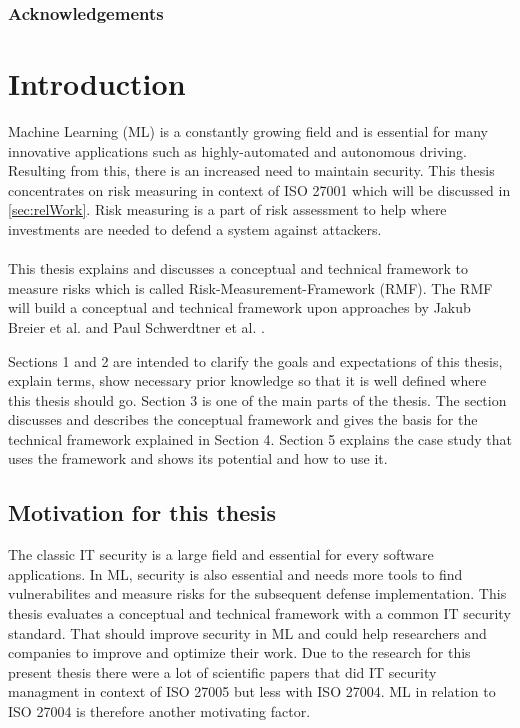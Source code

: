 \begin{abstract}

\end{abstract}

\subsubsection*{Acknowledgements}

\newpage

\section{Introduction}
\label{sec:intro}

Machine Learning (ML) is a constantly growing field and is essential for many innovative applications such as highly-automated and autonomous driving. Resulting from this,
there is an increased need to maintain security. This thesis concentrates on risk measuring in context of ISO 27001 which will be discussed in \ref{sec:relWork}. Risk
measuring is a part of risk assessment to help where investments are needed to defend a system against attackers. \\ \\
This thesis explains and discusses a conceptual and technical framework to measure risks which is called Risk-Measurement-Framework (RMF). The RMF will build a conceptual and technical
framework upon approaches by Jakub Breier et al. \cite{DBLP:journals/corr/abs-2012-04884} and Paul Schwerdtner et al. \cite{DBLP:journals/corr/abs-2011-04328}.

Sections 1 and 2 are intended to clarify the goals and expectations of this thesis, explain terms, show necessary prior knowledge so that it is well defined where this thesis should go. Section 3 is one of the main parts of the thesis. The section discusses and describes the conceptual framework and gives the basis for the technical framework explained in Section 4. Section 5 explains the case study that uses the framework and shows its potential and how to use it.

\subsection{Motivation for this thesis}

The classic IT security is a large field and essential for every software applications. In ML, security is also essential and needs more tools to find vulnerabilites and measure risks for the subsequent defense implementation. This thesis evaluates a conceptual and technical framework with a common IT security standard. That should improve security in ML and could help researchers and companies to improve and optimize their work. Due to the research for this present thesis there were a lot of scientific papers that did IT security managment in context of ISO 27005 but less with ISO 27004. ML in relation to ISO 27004 is therefore another motivating factor.

